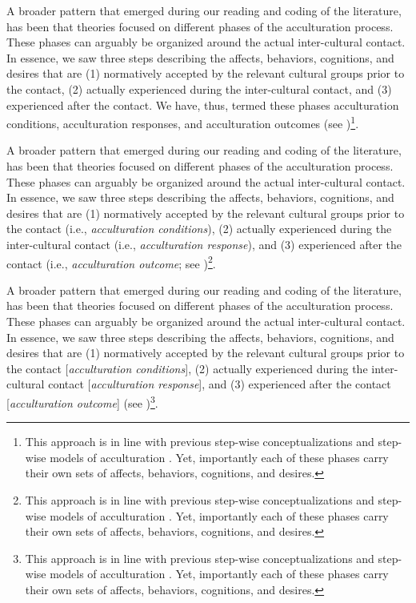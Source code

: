 A broader pattern that emerged during our reading and coding of the
literature, has been that theories focused on different phases of the
acculturation process. These phases can arguably be organized around the
actual inter-cultural contact. In essence, we saw three steps describing
the affects, behaviors, cognitions, and desires that are (1) normatively
accepted by the relevant cultural groups prior to the contact, (2)
actually experienced during the inter-cultural contact, and (3)
experienced after the contact. We have, thus, termed these phases
acculturation conditions, acculturation responses, and acculturation
outcomes (see
)\footnote{This approach is in line with previous step-wise conceptualizations \citep[e.g., process vs. outcome distinction;][]{Sam2006b} and step-wise models of acculturation \citep[e.g.,][]{Arends-Toth2006a, TeLindert2008a}. Yet, importantly each of these phases carry their own sets of affects, behaviors, cognitions, and desires.}.

A broader pattern that emerged during our reading and coding of the
literature, has been that theories focused on different phases of the
acculturation process. These phases can arguably be organized around the
actual inter-cultural contact. In essence, we saw three steps describing
the affects, behaviors, cognitions, and desires that are (1) normatively
accepted by the relevant cultural groups prior to the contact (i.e.,
\textit{acculturation conditions}), (2) actually experienced during the
inter-cultural contact (i.e., \textit{acculturation response}), and (3)
experienced after the contact (i.e., \textit{acculturation outcome}; see
)\footnote{This approach is in line with previous step-wise conceptualizations \citep[e.g., process vs. outcome distinction;][]{Sam2006b} and step-wise models of acculturation \citep[e.g.,][]{Arends-Toth2006a, TeLindert2008a}. Yet, importantly each of these phases carry their own sets of affects, behaviors, cognitions, and desires.}.

A broader pattern that emerged during our reading and coding of the
literature, has been that theories focused on different phases of the
acculturation process. These phases can arguably be organized around the
actual inter-cultural contact. In essence, we saw three steps describing
the affects, behaviors, cognitions, and desires that are (1) normatively
accepted by the relevant cultural groups prior to the contact
{[}\textit{acculturation conditions}{]}, (2) actually experienced during
the inter-cultural contact {[}\textit{acculturation response}{]}, and
(3) experienced after the contact {[}\textit{acculturation outcome}{]}
(see
)\footnote{This approach is in line with previous step-wise conceptualizations \citep[e.g., process vs. outcome distinction;][]{Sam2006b} and step-wise models of acculturation \citep[e.g.,][]{Arends-Toth2006a, TeLindert2008a}. Yet, importantly each of these phases carry their own sets of affects, behaviors, cognitions, and desires.}.

